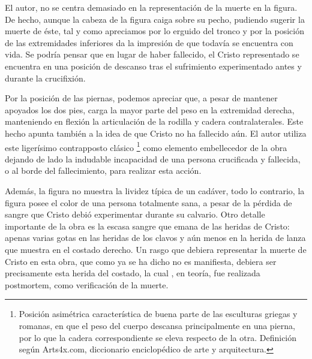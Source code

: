 El autor, no se centra demasiado en la representación de la muerte en la figura. De hecho, aunque la cabeza de la figura caiga sobre su pecho, pudiendo sugerir la muerte de éste, tal y como apreciamos por lo erguido del tronco y por la posición de las extremidades inferiores da la impresión de que todavía se encuentra con vida. Se podría pensar que en lugar de haber fallecido, el Cristo representado se encuentra en una posición de descanso tras el sufrimiento experimentado antes y durante la crucifixión. %

Por la posición de las piernas, podemos apreciar que, a pesar de mantener apoyados los dos pies, carga la mayor parte del peso en la extremidad derecha, manteniendo en flexión la articulación de la rodilla y cadera contralaterales. Este hecho apunta también a la idea de que
Cristo no ha fallecido aún. El autor utiliza este ligerísimo contrapposto clásico \footnote{Posición asimétrica característica de buena parte de las esculturas griegas y romanas, en que el peso del cuerpo descansa principalmente en una pierna, por lo que la cadera correspondiente se eleva respecto de la otra. Definición según Arts4x.com, diccionario enciclopédico de arte y arquitectura.\cite{RefWorks:69}} %
como elemento embellecedor de la obra dejando de lado la indudable incapacidad de una persona crucificada y fallecida, o al borde del fallecimiento, para realizar esta acción.

Además, la figura no muestra la lividez típica de un cadáver, todo lo contrario, la figura posee el color de una persona totalmente sana, a pesar de la pérdida de sangre que Cristo debió experimentar durante su calvario. Otro detalle importante de la obra es la escasa sangre que emana de las heridas de Cristo: apenas varias gotas en las heridas de los clavos y aún menos en la herida de lanza que muestra en el costado derecho. Un rasgo que debiera representar la muerte de Cristo en esta obra, que como ya se ha dicho no es manifiesta, debiera ser precisamente esta herida del costado, la cual%
, en teoría, fue realizada postmortem, como verificación de la muerte.


